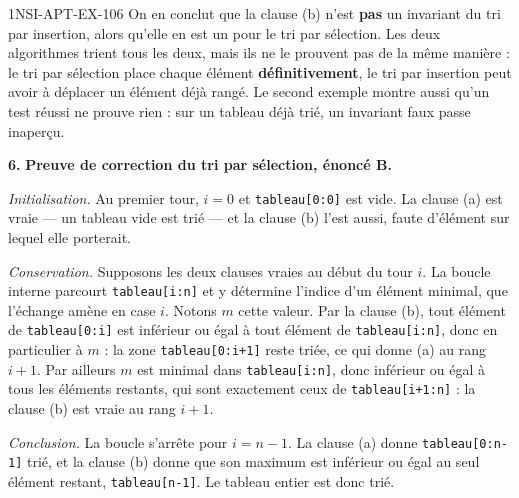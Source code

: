 \begin{corrige}{1NSI-APT-EX-106}
On en conclut que la clause (b) n'est \textbf{pas} un invariant du tri par insertion, alors
qu'elle en est un pour le tri par sélection. Les deux algorithmes trient tous les deux,
mais ils ne le prouvent pas de la même manière : le tri par sélection place chaque élément
\textbf{définitivement}, le tri par insertion peut avoir à déplacer un élément déjà rangé.
Le second exemple montre aussi qu'un test réussi ne prouve rien : sur un tableau déjà trié,
un invariant faux passe inaperçu.

\textbf{6.} \textbf{Preuve de correction du tri par sélection, énoncé B.}

\emph{Initialisation.} Au premier tour, $i=0$ et \lstinline{tableau[0:0]} est vide. La
clause (a) est vraie — un tableau vide est trié — et la clause (b) l'est aussi, faute
d'élément sur lequel elle porterait.

\emph{Conservation.} Supposons les deux clauses vraies au début du tour $i$. La boucle
interne parcourt \lstinline{tableau[i:n]} et y détermine l'indice d'un élément minimal, que
l'échange amène en case $i$. Notons $m$ cette valeur. Par la clause (b), tout élément de
\lstinline{tableau[0:i]} est inférieur ou égal à tout élément de \lstinline{tableau[i:n]},
donc en particulier à $m$ : la zone \lstinline{tableau[0:i+1]} reste triée, ce qui donne (a)
au rang $i+1$. Par ailleurs $m$ est minimal dans \lstinline{tableau[i:n]}, donc inférieur
ou égal à tous les éléments restants, qui sont exactement ceux de
\lstinline{tableau[i+1:n]} : la clause (b) est vraie au rang $i+1$.

\emph{Conclusion.} La boucle s'arrête pour $i = n-1$. La clause (a) donne
\lstinline{tableau[0:n-1]} trié, et la clause (b) donne que son maximum est inférieur ou
égal au seul élément restant, \lstinline{tableau[n-1]}. Le tableau entier est donc trié.

\end{corrige}
